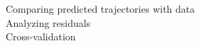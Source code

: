 \documentclass[preview]{standalone}
\begin{document}
Comparing predicted trajectories with data\\Analyzing residuals\\Cross-validation\\
\end{document}
